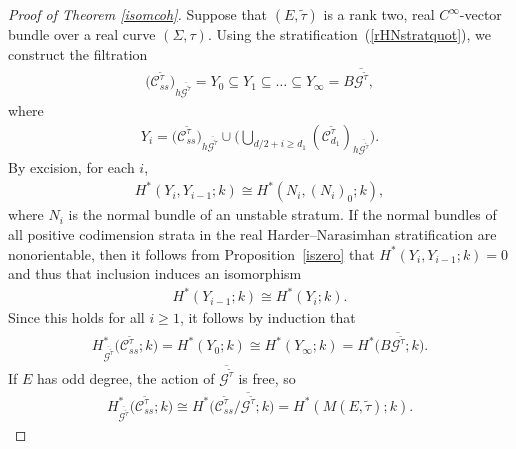 \documentclass[10pt,a4paper]{amsart}
\numberwithin{equation}{section}
\begin{document}
\begin{proof}[Proof of Theorem \ref{isomcoh}]
Suppose that $(E,\tilde{\tau})$ is a rank two, real $C^{\infty}$-vector bundle over a real curve $(\Sigma, \tau)$. Using the stratif\/ication~(\ref{rHNstratquot}), we construct the f\/iltration
\begin{gather*} \big({\mathcal C}_{ss}^{\tilde{\tau}}\big)_{h\overline{{\mathcal G}^{\tilde{\tau}}}} = Y_0 \subseteq Y_1 \subseteq \dots \subseteq Y_{\infty} = B\overline{{\mathcal G}^{\tilde{\tau}}}, \end{gather*}
where \begin{gather*} Y_i = \big({\mathcal C}_{ss}^{\tilde{\tau}}\big)_{h\overline{{\mathcal G}^{\tilde{\tau}}}} \cup \bigg( \bigcup_{ d/2+ i \geq d_1} ({\mathcal C}_{d_1}^{\tilde{\tau}})_{h\overline{{\mathcal G}^{\tilde{\tau}}}} \bigg).\end{gather*}
By excision, for each $i$, \begin{gather*}H^*(Y_i, Y_{i-1};k) \cong H^*(N_i, (N_i)_0; k),\end{gather*}
where $N_i$ is the normal bundle of an unstable stratum. If the normal bundles of all positive codimension strata in the real Harder--Narasimhan stratif\/ication are nonorientable, then it follows from Proposition~\ref{iszero} that $H^*(Y_i, Y_{i-1};k) = 0$ and thus that inclusion induces an isomorphism \begin{gather*}H^*(Y_{i-1};k) \cong H^*(Y_{i};k). \end{gather*}
Since this holds for all $i\geq 1$, it follows by induction that
\begin{gather*} H^*_{\overline{{\mathcal G}^{\tilde{\tau}}}}\big( {\mathcal C}_{ss}^{\tilde{\tau}};k\big) = H^*(Y_0;k) \cong H^*(Y_{\infty};k) = H^*\big(B\overline{{\mathcal G}^{\tilde{\tau}}};k\big). \end{gather*}
If $E$ has odd degree, the action of $\overline{{\mathcal G}^{\tilde{\tau}}}$ is free, so \begin{gather*}H^*_{\overline{{\mathcal G}^{\tilde{\tau}}}}\big( {\mathcal C}_{ss}^{\tilde{\tau}};k\big) \cong H^*\big( {\mathcal C}_{ss}^{\tilde{\tau}}/\overline{{\mathcal G}^{\tilde{\tau}}};k\big) = H^*(M(E,\tilde{\tau});k).\end{gather*}


\end{proof}
\end{document}
